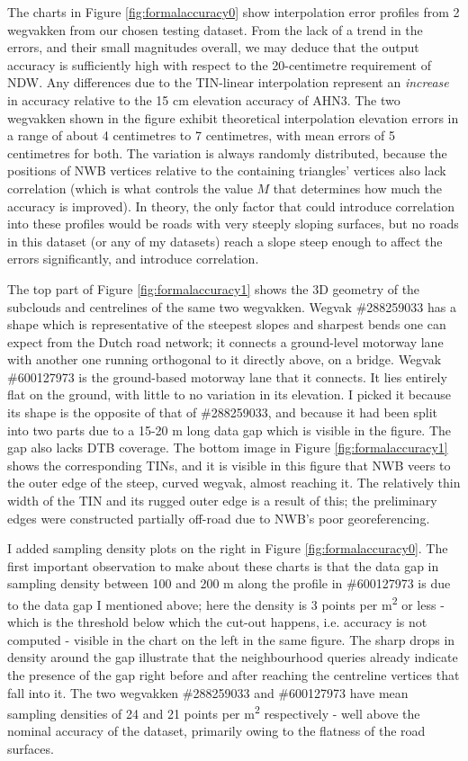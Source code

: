 The charts in Figure \ref{fig:formalaccuracy0} show interpolation error profiles from 2 wegvakken from our chosen testing dataset. From the lack of a trend in the errors, and their small magnitudes overall, we may deduce that the output accuracy is sufficiently high with respect to the 20-centimetre requirement of NDW. Any differences due to the TIN-linear interpolation represent an \textit{increase} in accuracy relative to the 15 cm elevation accuracy of AHN3. The two wegvakken shown in the figure exhibit theoretical interpolation elevation errors in a range of about 4 centimetres to 7 centimetres, with mean errors of 5 centimetres for both. The variation is always randomly distributed, because the positions of NWB vertices relative to the containing triangles' vertices also lack correlation (which is what controls the value $M$ that determines how much the accuracy is improved). In theory, the only factor that could introduce correlation into these profiles would be roads with very steeply sloping surfaces, but no roads in this dataset (or any of my datasets) reach a slope steep enough to affect the errors significantly, and introduce correlation.

The top part of Figure \ref{fig:formalaccuracy1} shows the 3D geometry of the subclouds and centrelines of the same two wegvakken. Wegvak \#288259033 has a shape which is representative of the steepest slopes and sharpest bends one can expect from the Dutch road network; it connects a ground-level motorway lane with another one running orthogonal to it directly above, on a bridge. Wegvak \#600127973 is the ground-based motorway lane that it connects. It lies entirely flat on the ground, with little to no variation in its elevation. I picked it because its shape is the opposite of that of \#288259033, and because it had been split into two parts due to a 15-20 m long data gap which is visible in the figure. The gap also lacks DTB coverage. The bottom image in Figure \ref{fig:formalaccuracy1} shows the corresponding TINs, and it is visible in this figure that NWB veers to the outer edge of the steep, curved wegvak, almost reaching it. The relatively thin width of the TIN and its rugged outer edge is a result of this; the preliminary edges were constructed partially off-road due to NWB's poor georeferencing.

I added sampling density plots on the right in Figure \ref{fig:formalaccuracy0}. The first important observation to make about these charts is that the data gap in sampling density between 100 and 200 m along the profile in \#600127973 is due to the data gap I mentioned above; here the density is 3 points per m\textsuperscript{2} or less - which is the threshold below which the cut-out happens, i.e. accuracy is not computed - visible in the chart on the left in the same figure. The sharp drops in density around the gap illustrate that the neighbourhood queries already indicate the presence of the gap right before and after reaching the centreline vertices that fall into it. The two wegvakken \#288259033 and \#600127973 have mean sampling densities of 24 and 21 points per m\textsuperscript{2} respectively - well above the nominal accuracy of the dataset, primarily owing to the flatness of the road surfaces.

